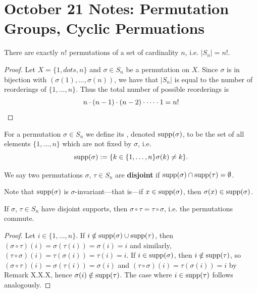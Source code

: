 \section{October 21 Notes: Permutation Groups, Cyclic Permuations}

\begin{propbox}
    There are exactly $n!$ permutations of a set of cardinality $n$, i.e. $|S_n| = n!$.
\end{propbox}
\begin{proof}
    Let $X = \{1, dots, n\}$ and $\sigma \in S_n$ be a permutation on $X$. Since $\sigma$ is in bijection with $(\sigma(1), \dots, \sigma(n))$, we have that $|S_n|$ is equal to the number of reorderings of $\{1, \dots, n\}$. Thus the total number of possible reorderings is
    \[ n \cdot (n-1) \cdot (n-2) \cdot \dots \cdot 1 = n! \qedhere \]
\end{proof}

\begin{defbox}
    For a permutation $\sigma \in S_n$ we define its , denoted $\text{supp}(\sigma)$, to be the set of all elements $\{1, \dots, n\}$ which are not fixed by $\sigma$, i.e.
    \[ \text{supp}(\sigma) := \{ k \in \{1, \dots, n\}  \sigma(k) \neq k\}. \] 

    We say two permutations $\sigma$, $\tau \in S_n$ are \textbf{disjoint} if $\text{supp}(\sigma) \cap \text{supp}(\tau) = \emptyset$. 
\end{defbox}

\begin{remark}
    Note that $\text{supp}(\sigma)$ is $\sigma$-invariant---that is---if $x \in \text{supp}(\sigma)$, then $\sigma(x) \in \text{supp}(\sigma)$. 
\end{remark}

\begin{propbox}
    If $\sigma$, $\tau \in S_n$ have disjoint supports, then $\sigma\circ\tau = \tau\circ\sigma$, i.e. the permutations commute.
\end{propbox}

\begin{proof}
    Let $i \in \{1, \dots, n\}$. If $i \notin \text{supp}(\sigma) \cup \text{supp}(\tau)$, then $(\sigma \circ \tau)(i) = \sigma(\tau(i)) = \sigma(i) = i$ and similarly, $(\tau \circ \sigma)(i) = \tau(\sigma(i)) = \tau(i) = i$. If $i \in \text{supp}(\sigma)$, then $i \notin \text{supp}(\tau)$, so $(\sigma \circ \tau)(i) = \sigma(\tau(i)) = \sigma(i)$ and $(\tau \circ \sigma)(i) = \tau(\sigma(i)) = i$ by Remark X.X.X, hence $\sigma(i) \notin \text{supp}(\tau)$. The case where $i \in \text{supp}(\tau)$ follows analogously.  
\end{proof}

